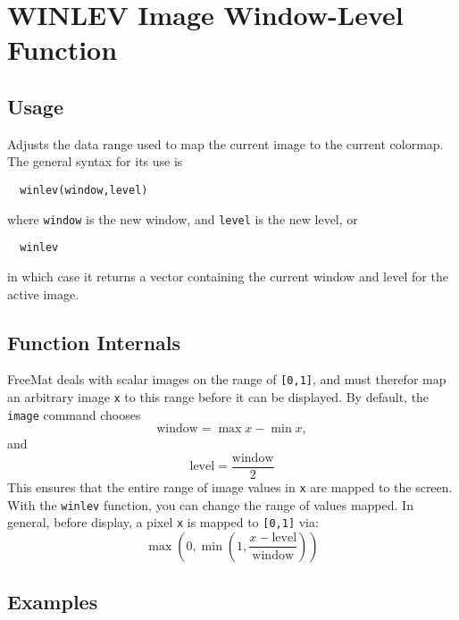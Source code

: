 \section{WINLEV Image Window-Level Function}

\subsection{Usage}

Adjusts the data range used to map the current image to the current
colormap.  The general syntax for its use is
\begin{verbatim}
  winlev(window,level)
\end{verbatim}
where \verb|window| is the new window, and \verb|level| is the new level, or
\begin{verbatim}
  winlev
\end{verbatim}
in which case it returns a vector containing the current window
and level for the active image.
\subsection{Function Internals}

FreeMat deals with scalar images on the range of \verb|[0,1]|, and must
therefor map an arbitrary image \verb|x| to this range before it can
be displayed.  By default, the \verb|image| command chooses 
\[
  \mathrm{window} = \max x - \min x,
\]
and
\[
  \mathrm{level} = \frac{\mathrm{window}}{2}
\]
This ensures that the entire range of image values in \verb|x| are 
mapped to the screen.  With the \verb|winlev| function, you can change
the range of values mapped.  In general, before display, a pixel \verb|x|
is mapped to \verb|[0,1]| via:
\[
   \max\left(0,\min\left(1,\frac{x - \mathrm{level}}{\mathrm{window}}
   \right)\right)
\]
\subsection{Examples}

